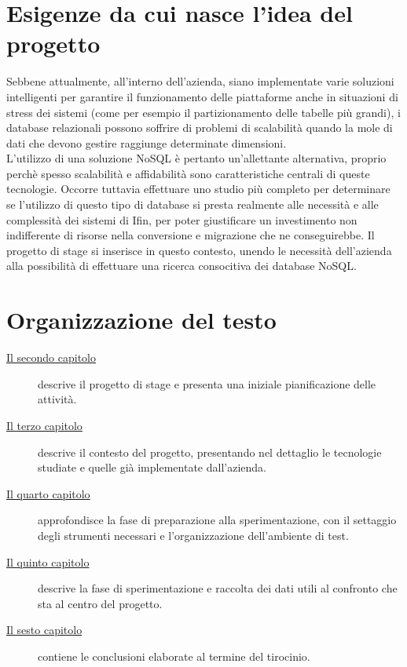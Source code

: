 \section{Esigenze da cui nasce l'idea del progetto}

Sebbene attualmente, all'interno dell'azienda, siano implementate varie soluzioni intelligenti per garantire il funzionamento delle piattaforme anche in situazioni di stress dei sistemi (come per esempio il partizionamento delle tabelle più grandi), i database relazionali possono soffrire di problemi di scalabilità quando la mole di dati che devono gestire raggiunge determinate dimensioni.\\
L'utilizzo di una soluzione NoSQL è pertanto un'allettante alternativa, proprio perchè spesso scalabilità e affidabilità sono caratteristiche centrali di queste tecnologie. Occorre tuttavia effettuare uno studio più completo per determinare se l'utilizzo di questo tipo di database si presta realmente alle necessità e alle complessità dei sistemi di Ifin, per poter giustificare un investimento non indifferente di risorse nella conversione e migrazione che ne conseguirebbe.
Il progetto di stage si inserisce in questo contesto, unendo le necessità dell'azienda alla possibilità di effettuare una ricerca consocitiva dei database NoSQL.\\

\section{Organizzazione del testo}

\begin{description}
    \item[{\hyperref[cap:descrizione-stage]{Il secondo capitolo}}] descrive il progetto di stage e presenta una iniziale pianificazione delle attività.
    
    \item[{\hyperref[cap:contesto]{Il terzo capitolo}}] descrive il contesto del progetto, presentando nel dettaglio le tecnologie studiate e quelle già implementate dall'azienda.
    
    \item[{\hyperref[cap:capitolo4]{Il quarto capitolo}}] approfondisce la fase di preparazione alla sperimentazione, con il settaggio degli strumenti necessari e l'organizzazione dell'ambiente di test.
    
    \item[{\hyperref[cap:capitolo5]{Il quinto capitolo}}] descrive la fase di sperimentazione e raccolta dei dati utili al confronto che sta al centro del progetto.
    
    \item[{\hyperref[cap:capitolo6]{Il sesto capitolo}}] contiene le conclusioni elaborate al termine del tirocinio.
    
\end{description}